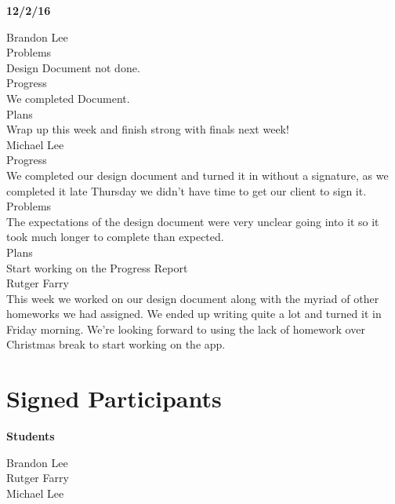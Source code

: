 \documentclass[letterpaper,10pt,titlepage]{article}
\begin{document}
\textbf{12/2/16}

Brandon Lee\\

Problems\\
Design Document not done.\\

Progress\\
We completed Document.\\

Plans\\
Wrap up this week and finish strong with finals next week!\\

Michael Lee\\

Progress\\
We completed our design document and turned it in without a signature, as we completed it late Thursday we didn't have time to get our client to sign it.\\

Problems\\
The expectations of the design document were very unclear going into it so it took much longer to complete than expected.\\

Plans\\
Start working on the Progress Report\\

Rutger Farry\\

This week we worked on our design document along with the myriad of other homeworks we had assigned. We ended up writing quite a lot and turned it in Friday morning. We're looking forward to using the lack of homework over Christmas break to start working on the app.\\

\newpage

\section{Signed Participants}

\textbf{Students}

Brandon Lee\\
Rutger Farry\\
Michael Lee\\
\end{document}
